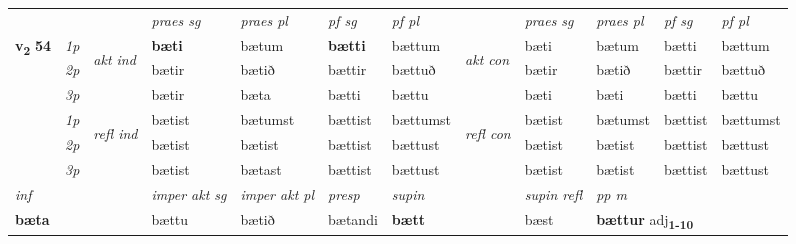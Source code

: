 \begin{longtable}[l]{X>{\footnotesize\itshape}llXXXXlXXXX}
\midrule

 & &   & \textit{praes sg}  & \textit{praes pl}    & \textit{ pf sg} & \textit{pf pl} & & \textit{praes sg}  & \textit{praes pl}    & \textit{pf sg} & \textit{pf pl }  \\ \cmidrule{4-7} \cmidrule{9-12}
 \multirow{2}{*}{{{\textbf{v{\textsubscript{2}}} \Large{\textbf{54}}}}}  & 1p & \multirow{3}{*}{\begin{turn}{90}\textit{akt ind}\end{turn}} & \textbf{bæti} & bætum & \textbf{bætti} & bættum & \multirow{3}{*}{\begin{turn}{90}\textit{akt con}\end{turn}} &bæti & bætum & bætti & bættum\\*
 & 2p &  &  bætir  & bætið & bættir & bættuð & & bætir & bætið & bættir & bættuð \\*
 & 3p &  & bætir & bæta & bætti & bættu & & bæti & bæti& bætti & bættu \\*
\cmidrule{4-7} \cmidrule{9-12}
 & 1p & \multirow{3}{*}{\begin{turn}{90}\textit{refl ind}\end{turn}}  & bætist & bætumst & bættist & bættumst & \multirow{3}{*}{\begin{turn}{90}\textit{refl con}\end{turn}}  &bætist & bætumst & bættist & bættumst \\*
 & 2p &  & bætist & bætist & bættist & bættust & &bætist & bætist & bættist & bættust \\*
 & 3p  & & bætist & bætast & bættist & bættust & & bætist & bætist& bættist & bættust \\*
\cmidrule{4-7} \cmidrule{9-12}

   {\textit{inf}} & &  & \textit{imper akt sg} & \textit{imper akt pl}   & \textit{presp} & \textit{supin} && \textit{supin refl} & \textit{pp m} \\*
  {\textbf{bæta}} & && bættu  & bætið   & bætandi &  \textbf{bætt} && bæst & \multicolumn{2}{l}{\textbf{bættur} adj\textbf{\textsubscript{1-10}}} \\*

\midrule


\end{longtable}
